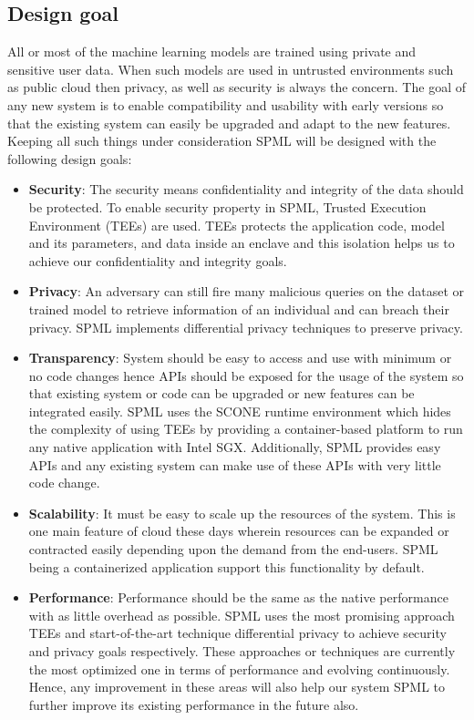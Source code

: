 \subsection{Design goal}
All or most of the machine learning models are trained using private and sensitive user data. When such models are used in untrusted environments such as public cloud then privacy, as well as security is always the concern. The goal of any new system is to enable compatibility and usability with early versions so that the existing system can easily be upgraded and adapt to the new features. Keeping all such things under consideration SPML will be designed with the following design goals:
\begin{itemize}
  \item \textbf{Security}: The security means confidentiality and integrity of the data should be protected. To enable security property in SPML, Trusted Execution Environment (TEEs) are used. TEEs protects the application code, model and its parameters, and data inside an enclave and this isolation helps us to achieve our confidentiality and integrity goals.
  \vspace{-0.3cm}\item \textbf{Privacy}: An adversary can still fire many malicious queries on the dataset or trained model to retrieve information of an individual and can breach their privacy. SPML implements differential privacy techniques to preserve privacy.
  \vspace{-0.3cm}\item \textbf{Transparency}: System should be easy to access and use with minimum or no code changes hence APIs should be exposed for the usage of the system so that existing system or code can be upgraded or new features can be integrated easily. SPML uses the SCONE runtime environment which hides the complexity of using TEEs by providing a container-based platform to run any native application with Intel SGX. Additionally, SPML provides easy APIs and any existing system can make use of these APIs with very little code change.
  \vspace{-0.3cm}\item \textbf{Scalability}: It must be easy to scale up the resources of the system. This is one main feature of cloud these days wherein resources can be expanded or contracted easily depending upon the demand from the end-users. SPML being a containerized application support this functionality by default.
  \vspace{-0.3cm}\item \textbf{Performance}: Performance should be the same as the native performance with as little overhead as possible. SPML uses the most promising approach TEEs and start-of-the-art technique differential privacy to achieve security and privacy goals respectively. These approaches or techniques are currently the most optimized one in terms of performance and evolving continuously. Hence, any improvement in these areas will also help our system SPML to further improve its existing performance in the future also.

\end{itemize}
